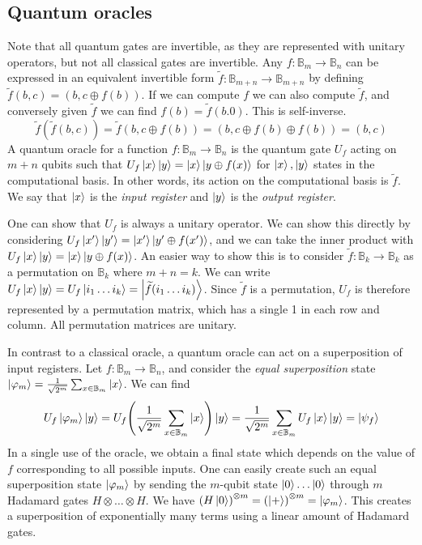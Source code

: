 \subsection{Quantum oracles}
Note that all quantum gates are invertible, as they are represented with unitary operators, but not all classical gates are invertible.
Any \( f \colon \mathbb B_m \to \mathbb B_n \) can be expressed in an equivalent invertible form \( \widetilde f \colon \mathbb B_{m+n} \to \mathbb B_{m+n} \) by defining \( \widetilde f(b,c) = (b, c \oplus f(b)) \).
If we can compute \( f \) we can also compute \( \widetilde f \), and conversely given \( \widetilde f \) we can find \( f(b) = \widetilde f(b.0) \).
This is self-inverse.
\[ \widetilde f(\widetilde f(b,c)) = \widetilde f(b, c \oplus f(b)) = (b, c \oplus f(b) \oplus f(b)) = (b, c) \]
A quantum oracle for a function \( f \colon \mathbb B_m \to \mathbb B_n \) is the quantum gate \( U_f \) acting on \( m + n \) qubits such that \( U_f \ket{x} \ket{y} = \ket{x} \ket{y \oplus f(x)} \) for \( \ket{x}, \ket{y} \) states in the computational basis.
In other words, its action on the computational basis is \( \widetilde f \).
We say that \( \ket{x} \) is the \emph{input register} and \( \ket{y} \) is the \emph{output register}.

One can show that \( U_f \) is always a unitary operator.
We can show this directly by considering \( U_f \ket{x'}\ket{y'} = \ket{x'}\ket{y' \oplus f(x')} \), and we can take the inner product with \( U_f \ket{x} \ket{y} = \ket{x} \ket{y \oplus f(x)} \).
An easier way to show this is to consider \( \widetilde f \colon \mathbb B_k \to \mathbb B_k \) as a permutation on \( \mathbb B_k \) where \( m + n = k \).
We can write \( U_f \ket{x} \ket{y} = U_f \ket{i_1 \dots i_k} = \ket{\widetilde f(i_1 \dots i_k)} \).
Since \( \widetilde f \) is a permutation, \( U_f \) is therefore represented by a permutation matrix, which has a single 1 in each row and column.
All permutation matrices are unitary.

In contrast to a classical oracle, a quantum oracle can act on a superposition of input registers.
Let \( f \colon \mathbb B_m \to \mathbb B_n \), and consider the \emph{equal superposition} state \( \ket{\varphi_m} = \frac{1}{\sqrt{2^m}} \sum_{x \in \mathbb B_m} \ket{x} \).
We can find
\[ U_f \ket{\varphi_m} \ket{y} = U_f \qty( \frac{1}{\sqrt{2^m}} \sum_{x \in \mathbb B_m} \ket{x}) \ket{y} = \frac{1}{\sqrt{2^m}} \sum_{x \in \mathbb B_m} U_f \ket{x} \ket{y} = \ket{\psi_f} \]
In a single use of the oracle, we obtain a final state which depends on the value of \( f \) corresponding to all possible inputs.
One can easily create such an equal superposition state \( \ket{\varphi_m} \) by sending the \( m \)-qubit state \( \ket{0} \dots \ket{0} \) through \( m \) Hadamard gates \( H \otimes \dots \otimes H \).
We have \( \qty(H \ket{0})^{\otimes m} = \qty(\ket{+})^{\otimes m} = \ket{\varphi_m} \).
This creates a superposition of exponentially many terms using a linear amount of Hadamard gates.
